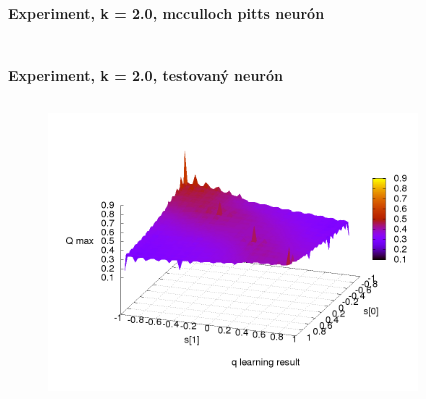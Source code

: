 \documentclass[xcolor=dvipsnames]{beamer}
\begin{document}
\begin{frame}{\bf Experiment, k = 2.0, mcculloch pitts neurón}
\begin{columns}
\begin{column}{0.5\textwidth}
\begin{figure}[ht]
        \end{figure}

	\end{column}
\end{columns}

\end{frame}


\begin{frame}{\bf Experiment, k = 2.0, testovaný neurón}

\begin{columns}
	\begin{column}{0.5\textwidth}

        \begin{figure}[ht]

        \begin{center}
        \includegraphics[width=1.0\textwidth]{experiment_02/testing_neuron/q_map.png}
        \end{center}

        \end{figure}

	\end{column}
	\begin{column}{0.5\textwidth}

        \begin{figure}[ht]


\end{figure}
\end{column}
\end{columns}
\end{frame}
\end{document}
